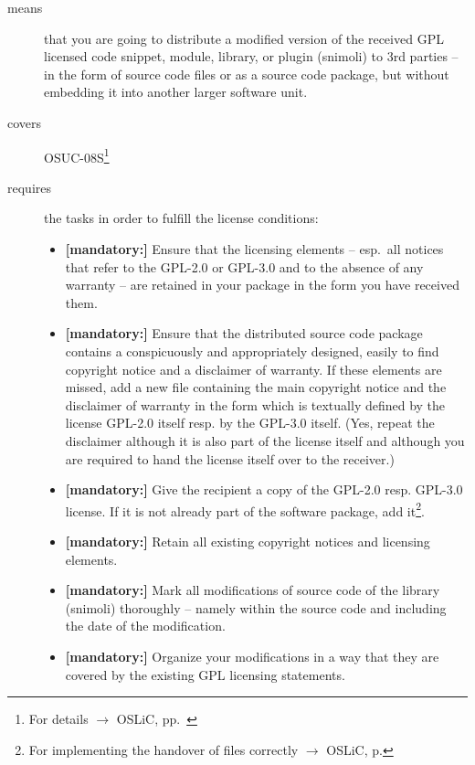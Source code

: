\begin{description}
\item[means] that you are going to distribute a modified version of the received
GPL licensed code snippet, module, library, or plugin (snimoli) to 3rd parties
-- in the form of source code files or as a source code package, but without
embedding it into another larger software unit.
\item[covers] OSUC-08S\footnote{For details $\rightarrow$ OSLiC, pp.\
\pageref{OSUC-08S-DEF}}
\item[requires] the tasks in order to fulfill the license conditions:
\begin{itemize}
 
  \item \textbf{[mandatory:]} Ensure that the licensing elements -- esp.\ all
  notices that refer to the GPL-2.0 or GPL-3.0 and to the absence of any
  warranty -- are retained in your package in the form you have received them.

  \item \textbf{[mandatory:]} Ensure that the distributed source code package
  contains a conspicuously and appropriately designed, easily to find copyright
  notice and a disclaimer of warranty. If these elements are missed, add a new
  file containing the main copyright notice and the disclaimer of warranty in the
  form which is textually defined by the license GPL-2.0 itself resp. by the
  GPL-3.0 itself. (Yes, repeat the disclaimer although it is also part of the
  license itself and although you are required to hand the license itself over
  to the receiver.)
  
  \item \textbf{[mandatory:]} Give the recipient a copy of the GPL-2.0 resp.
  GPL-3.0 license. If it is not already part of the software package, add
  it\footnote{For implementing the handover of files correctly $\rightarrow$
  OSLiC, p. \pageref{DistributingFilesHint}}.
  
  \item \textbf{[mandatory:]} Retain all existing copyright notices and
  licensing elements.
  
  \item \textbf{[mandatory:]} Mark all modifications of source code of the
  library (snimoli) thoroughly -- namely within the source code and including
  the date of the modification.
  
  \item \textbf{[mandatory:]} Organize your modifications in a way that they are
  covered by the existing GPL licensing statements.
    

\end{itemize}
\end{description}
